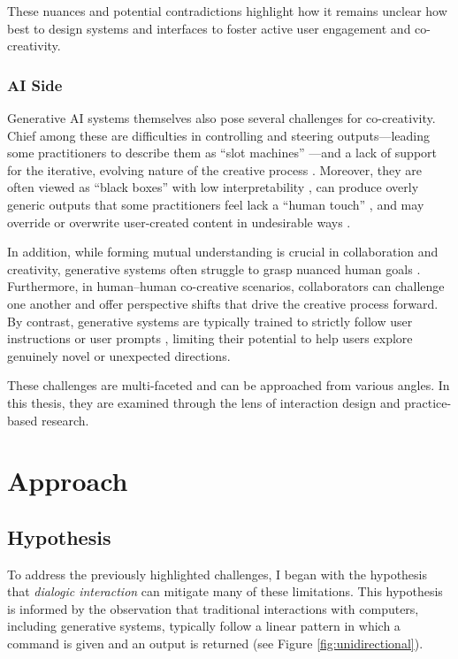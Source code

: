 These nuances and potential contradictions highlight how it remains unclear how best to design systems and interfaces to foster active user engagement and co-creativity. 

\subsubsection{AI Side}
Generative AI systems themselves also pose several challenges for co-creativity. Chief among these are difficulties in controlling and steering outputs—leading some practitioners to describe them as ``slot machines'' \citep{Nebelong2023-rb}—and a lack of support for the iterative, evolving nature of the creative process \citep{Park2024-gw}. Moreover, they are often viewed as ``black boxes'' with low interpretability \citep{Llano2022-ti, El-Assady2022-qc}, can produce overly generic outputs that some practitioners feel lack a ``human touch'' \citep{Park2024-gw}, and may override or overwrite user-created content in undesirable ways \citep{Buschek2021-ks}.

In addition, while forming mutual understanding is crucial in collaboration and creativity, generative systems often struggle to grasp nuanced human goals \citep{Bown2024-yx}. Furthermore, in human–human co-creative scenarios, collaborators can challenge one another and offer perspective shifts that drive the creative process forward. By contrast, generative systems are typically trained to strictly follow user instructions \citep{OpenAI2022-pj} or user prompts \citep{Ramesh2022-kc}, limiting their potential to help users explore genuinely novel or unexpected directions.

These challenges are multi-faceted and can be approached from various angles. In this thesis, they are examined through the lens of interaction design and practice-based research. 

\section{Approach}

\subsection{Hypothesis}

To address the previously highlighted challenges, I began with the hypothesis that \emph{dialogic interaction} can mitigate many of these limitations. This hypothesis is informed by the observation that traditional interactions with computers, including generative systems, typically follow a linear pattern in which a command is given and an output is returned (see Figure \ref{fig:unidirectional}). 

